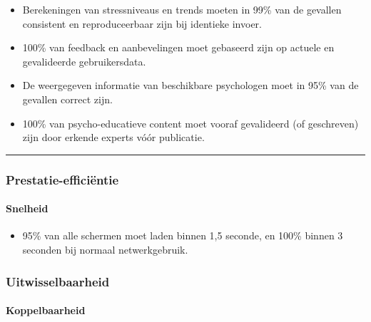\begin{itemize}
    \item Berekeningen van stressniveaus en trends moeten in 99\% van de gevallen consistent en reproduceerbaar zijn bij identieke invoer.
    \item 100\% van feedback en aanbevelingen moet gebaseerd zijn op actuele en gevalideerde gebruikersdata.
    \item De weergegeven informatie van beschikbare psychologen moet in 95\% van de gevallen correct zijn.
    \item 100\% van psycho-educatieve content moet vooraf gevalideerd (of geschreven) zijn door erkende experts vóór publicatie.
\end{itemize}

\vspace{1em}
\vspace{1em}
\hrule
\vspace{1em}

\subsubsection{Prestatie-efficiëntie}
\label{subsubsec:prestatie-efficientie}

\vspace{1em}

\paragraph{Snelheid}
\vspace{1em}

\begin{itemize}
    \item 95\% van alle schermen moet laden binnen 1,5 seconde, en 100\% binnen 3 \newline seconden bij normaal netwerkgebruik.
\end{itemize}

\vspace{1em}
\vspace{1em}
\vspace{1em}

\subsubsection{Uitwisselbaarheid}
\label{subsubsec:uitwisselbaarheid}

\vspace{1em}

\paragraph{Koppelbaarheid}
\vspace{1em}

